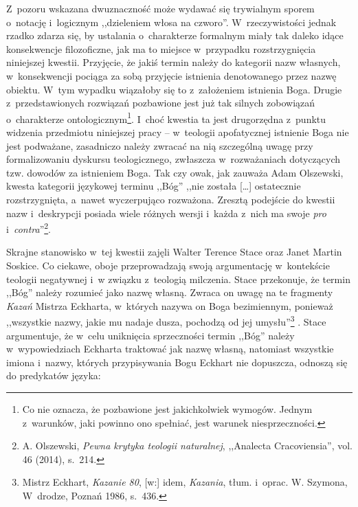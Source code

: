 Z~pozoru wskazana dwuznaczność może wydawać się trywialnym sporem o~notację i~logicznym ,,dzieleniem włosa na czworo''. W~rzeczywistości jednak rzadko zdarza się, by ustalania o~charakterze formalnym miały tak daleko idące konsekwencje filozoficzne, jak ma to miejsce w~przypadku rozstrzygnięcia niniejszej kwestii. Przyjęcie, że jakiś termin należy do kategorii nazw własnych, w~konsekwencji pociąga za sobą przyjęcie istnienia denotowanego przez nazwę obiektu. W~tym wypadku wiązałoby się to z~założeniem istnienia Boga. Drugie z~przedstawionych rozwiązań pozbawione jest już tak silnych zobowiązań o~charakterze ontologicznym\footnote{Co nie oznacza, że pozbawione jest jakichkolwiek wymogów. Jednym z~warunków, jaki powinno ono spełniać, jest warunek niesprzeczności.}. I~choć kwestia ta jest drugorzędna z~punktu widzenia przedmiotu niniejszej pracy -- w~teologii apofatycznej istnienie Boga nie jest podważane, zasadniczo należy zwracać na nią szczególną uwagę przy formalizowaniu dyskursu teologicznego, zwłaszcza w~rozważaniach dotyczących tzw. dowodów za istnieniem Boga. Tak czy owak, jak zauważa Adam Olszewski, kwesta kategorii językowej terminu ,,Bóg'' ,,nie została [\ldots] ostatecznie rozstrzygnięta, a~nawet wyczerpująco rozważona. Zresztą podejście do kwestii nazw i~deskrypcji posiada wiele różnych wersji i~każda z~nich ma swoje \textit{pro} i~\textit{contra}''\footnote{A. Olszewski, \textit{Pewna krytyka teologii naturalnej}, ,,Analecta Cracoviensia'', vol. 46 (2014), s.~214.}.

Skrajne stanowisko w~tej kwestii zajęli Walter Terence Stace oraz Janet Martin Soskice. Co ciekawe, oboje przeprowadzają swoją argumentację w~kontekście teologii negatywnej i~w związku z~teologią milczenia. Stace przekonuje, że termin ,,Bóg'' należy rozumieć jako nazwę własną. Zwraca on uwagę na te fragmenty \textit{Kazań} Mistrza Eckharta, w~których nazywa on Boga bezimiennym, ponieważ ,,wszystkie nazwy, jakie mu nadaje dusza, pochodzą od jej umysłu''\footnote{Mistrz Eckhart, \textit{Kazanie 80}, [w:] idem, \textit{Kazania}, tłum. i~oprac. W. Szymona, W~drodze, Poznań 1986, s.~436.} . Stace argumentuje, że w~celu uniknięcia sprzeczności termin ,,Bóg'' należy w~wypowiedziach Eckharta traktować jak nazwę własną, natomiast wszystkie imiona i~nazwy, których przypisywania Bogu Eckhart nie dopuszcza, odnoszą się do predykatów języka:

